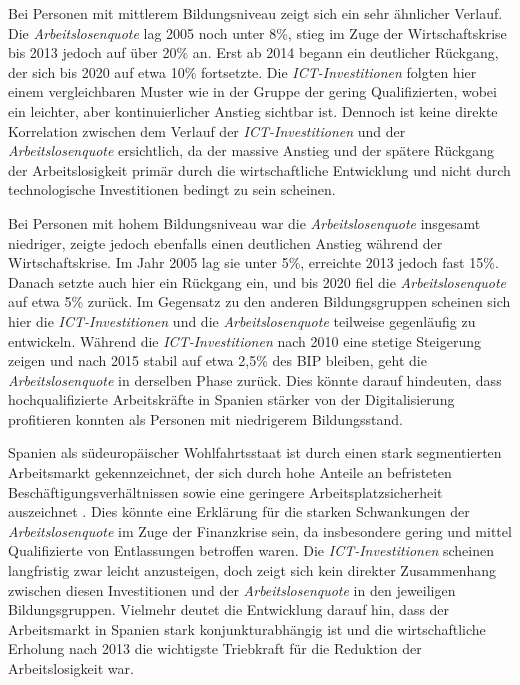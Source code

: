 Bei Personen mit mittlerem Bildungsniveau zeigt sich ein sehr ähnlicher Verlauf. Die 
\textit{Arbeitslosenquote} lag 2005 noch unter 8\%, stieg im Zuge der Wirtschaftskrise 
bis 2013 jedoch auf über 20\% an. Erst ab 2014 begann ein deutlicher Rückgang, der sich bis 
2020 auf etwa 10\% fortsetzte. Die \textit{\ac{ICT}-Investitionen} folgten hier einem 
vergleichbaren Muster wie in der Gruppe der gering Qualifizierten, wobei ein leichter, 
aber kontinuierlicher Anstieg sichtbar ist. Dennoch ist keine direkte Korrelation 
zwischen dem Verlauf der \textit{\ac{ICT}-Investitionen} und der \textit{Arbeitslosenquote}  
ersichtlich, da der massive Anstieg und der spätere Rückgang der Arbeitslosigkeit 
primär durch die wirtschaftliche Entwicklung und nicht durch technologische 
Investitionen bedingt zu sein scheinen.

Bei Personen mit hohem Bildungsniveau war die \textit{Arbeitslosenquote} insgesamt 
niedriger, zeigte jedoch ebenfalls einen deutlichen Anstieg während der Wirtschaftskrise. 
Im Jahr 2005 lag sie unter 5\%, erreichte 2013 jedoch fast 15\%. Danach setzte auch hier 
ein Rückgang ein, und bis 2020 fiel die \textit{Arbeitslosenquote} auf etwa 5\% zurück. Im 
Gegensatz zu den anderen Bildungsgruppen scheinen sich hier die 
\textit{\ac{ICT}-Investitionen} und die \textit{Arbeitslosenquote} teilweise gegenläufig zu 
entwickeln. Während die \textit{\ac{ICT}-Investitionen} nach 2010 eine stetige Steigerung 
zeigen und nach 2015 stabil auf etwa 2,5\% des BIP bleiben, geht die 
\textit{Arbeitslosenquote} in derselben Phase zurück. Dies könnte darauf hindeuten, dass 
hochqualifizierte Arbeitskräfte in Spanien stärker von der Digitalisierung profitieren 
konnten als Personen mit niedrigerem Bildungsstand.

Spanien als südeuropäischer Wohlfahrtsstaat ist durch einen stark segmentierten 
Arbeitsmarkt gekennzeichnet, der sich durch hohe Anteile an befristeten 
Beschäftigungsverhältnissen sowie eine geringere Arbeitsplatzsicherheit auszeichnet 
\parencite[vgl.][S. F159–F162]{bentolila2012two}. Dies könnte eine Erklärung für die starken 
Schwankungen der \textit{Arbeitslosenquote} im Zuge der Finanzkrise sein, da insbesondere 
gering und mittel Qualifizierte von Entlassungen betroffen waren. Die 
\textit{\ac{ICT}-Investitionen} scheinen langfristig zwar leicht anzusteigen, doch zeigt 
sich kein direkter Zusammenhang zwischen diesen Investitionen und der 
\textit{Arbeitslosenquote} in den jeweiligen Bildungsgruppen. Vielmehr deutet die 
Entwicklung darauf hin, dass der Arbeitsmarkt in Spanien stark konjunkturabhängig ist und 
die wirtschaftliche Erholung nach 2013 die wichtigste Triebkraft für die Reduktion der 
Arbeitslosigkeit war.

